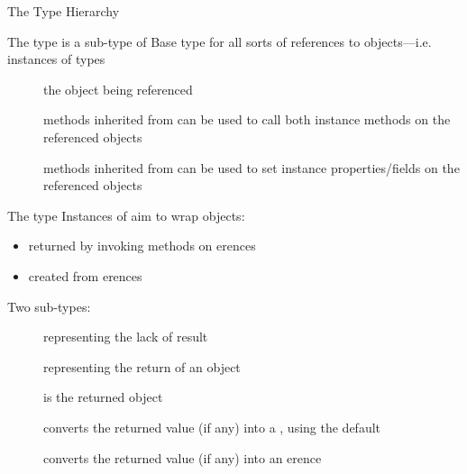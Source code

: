 \documentclass[handout]{beamer}
\begin{document}
\begin{frame}[allowframebreaks]{The  Type Hierarchy}
    \begin{block}{The  type is a sub-type of }
        \centering
        Base type for all sorts of references to \alert{objects}---i.e. instances of types
    \end{block}
    \begin{description}
        \item[] the object being referenced
        
        \item[] methods inherited from  can be used to call both \alert{instance} methods on the referenced objects
        
        \item[] methods inherited from  can be used to set \alert{instance} properties/fields on the referenced objects
    \end{description}

    \framebreak

    \begin{block}{The  type}
        Instances of  aim to wrap objects:
        \begin{itemize}
            \item returned by invoking methods on erences
            \item created from erences
        \end{itemize}

        Two sub-types:
        \begin{description}
            \item[] representing the lack of result
            \item[] representing the return of an object   
        \end{description}
    \end{block}
    \begin{description}
        \item[] is the returned object
        
        \item[] converts the returned value (if any) into a , using the default 
        
        \item[] converts the returned value (if any) into an erence
    \end{description}

\end{frame}
\end{document}
